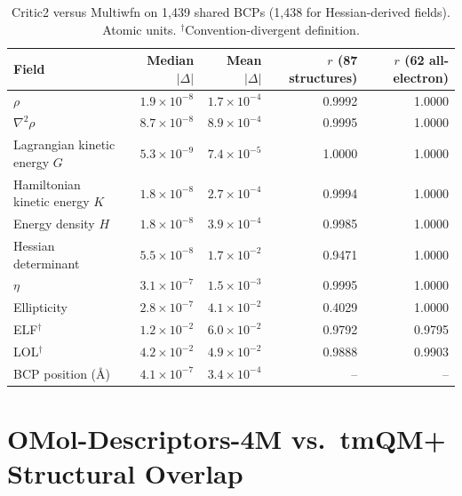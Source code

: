 \begin{table}[h]
\centering
\small
\caption{Critic2 versus Multiwfn on 1{,}439 shared BCPs (1{,}438 for Hessian-derived
fields). Atomic units. $^\dagger$Convention-divergent definition.}
\label{tab:xval_qtaim}
\begin{tabular}{lrrrr}
\toprule
Field & Median $|\Delta|$ & Mean $|\Delta|$ & $r$ (87 structures) & $r$ (62 all-electron) \\
\midrule
$\rho$                               & $1.9\times10^{-8}$ & $1.7\times10^{-4}$ & 0.9992 & 1.0000 \\
$\nabla^2\rho$                       & $8.7\times10^{-8}$ & $8.9\times10^{-4}$ & 0.9995 & 1.0000 \\
Lagrangian kinetic energy $G$        & $5.3\times10^{-9}$ & $7.4\times10^{-5}$ & 1.0000 & 1.0000 \\
Hamiltonian kinetic energy $K$       & $1.8\times10^{-8}$ & $2.7\times10^{-4}$ & 0.9994 & 1.0000 \\
Energy density $H$                   & $1.8\times10^{-8}$ & $3.9\times10^{-4}$ & 0.9985 & 1.0000 \\
Hessian determinant                  & $5.5\times10^{-8}$ & $1.7\times10^{-2}$ & 0.9471 & 1.0000 \\
$\eta$                               & $3.1\times10^{-7}$ & $1.5\times10^{-3}$ & 0.9995 & 1.0000 \\
Ellipticity                          & $2.8\times10^{-7}$ & $4.1\times10^{-2}$ & 0.4029 & 1.0000 \\
ELF$^\dagger$                        & $1.2\times10^{-2}$ & $6.0\times10^{-2}$ & 0.9792 & 0.9795 \\
LOL$^\dagger$                        & $4.2\times10^{-2}$ & $4.9\times10^{-2}$ & 0.9888 & 0.9903 \\
BCP position (\AA)                   & $4.1\times10^{-7}$ & $3.4\times10^{-4}$ & --     & --     \\
\bottomrule
\end{tabular}
\end{table}
\endgroup

\section{OMol-Descriptors-4M vs.\ tmQM+ Structural Overlap}
\label{app:umap_omol_vs_tmqmplus}

